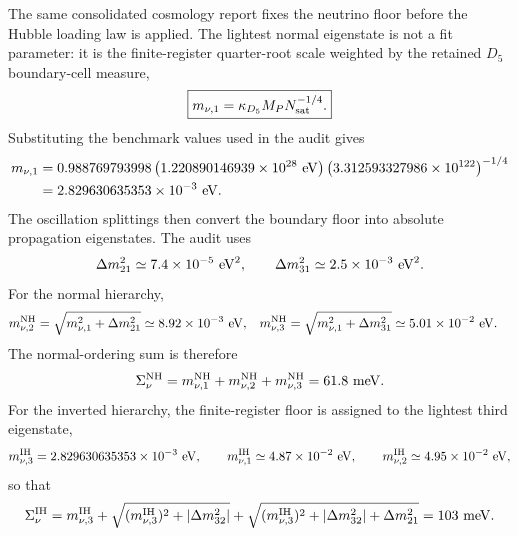 \documentclass[11pt]{article}
\newcommand{\Nsat}{N_{\rm sat}}
\newcommand{\kappad}{\kappa_{D_5}}
\begin{document}
The same consolidated cosmology report fixes the neutrino floor before the Hubble
loading law is applied.  The lightest normal eigenstate is not a fit parameter:
it is the finite-register quarter-root scale weighted by the retained
\(D_5\) boundary-cell measure,
\begin{equation}
\label{eq:neutrino-floor-from-register}
 \boxed{
 m_{\nu,1}
 =
 \kappad M_P\Nsat^{-1/4}.
 }
\end{equation}
Substituting the benchmark values used in the audit gives
\begin{align}
\label{eq:neutrino-floor-numeric-substitution}
 m_{\nu,1}
 &=
 0.988769793998
 \left(1.220890146939\times10^{28}\ {\rm eV}\right)
 \left(3.312593327986\times10^{122}\right)^{-1/4}
 \notag\\
 &=
 2.829630635353\times10^{-3}\ {\rm eV}.
\end{align}
The oscillation splittings then convert the boundary floor into absolute
propagation eigenstates.  The audit uses
\begin{equation}
\label{eq:neutrino-oscillation-splittings}
 \Delta m_{21}^2\simeq7.4\times10^{-5}\ {\rm eV}^2,
 \qquad
 \Delta m_{31}^2\simeq2.5\times10^{-3}\ {\rm eV}^2.
\end{equation}
For the normal hierarchy,
\begin{align}
\label{eq:normal-hierarchy-eigenstates}
 m_{\nu,2}^{\rm NH}
 &=
 \sqrt{m_{\nu,1}^2+\Delta m_{21}^2}
 \simeq8.92\times10^{-3}\ {\rm eV},
 &
 m_{\nu,3}^{\rm NH}
 &=
 \sqrt{m_{\nu,1}^2+\Delta m_{31}^2}
 \simeq5.01\times10^{-2}\ {\rm eV}.
\end{align}
The normal-ordering sum is therefore
\begin{equation}
\label{eq:normal-hierarchy-sum}
 \Sigma_{\nu}^{\rm NH}
 =
 m_{\nu,1}^{\rm NH}
 +m_{\nu,2}^{\rm NH}
 +m_{\nu,3}^{\rm NH}
 =
 61.8\ {\rm meV}.
\end{equation}
For the inverted hierarchy, the finite-register floor is assigned to the
lightest third eigenstate,
\begin{equation}
\label{eq:inverted-hierarchy-eigenstates}
 m_{\nu,3}^{\rm IH}
 =
 2.829630635353\times10^{-3}\ {\rm eV},
 \qquad
 m_{\nu,1}^{\rm IH}\simeq4.87\times10^{-2}\ {\rm eV},
 \qquad
 m_{\nu,2}^{\rm IH}\simeq4.95\times10^{-2}\ {\rm eV},
\end{equation}
so that
\begin{equation}
\label{eq:inverted-hierarchy-sum}
 \Sigma_{\nu}^{\rm IH}
 =
 m_{\nu,3}^{\rm IH}
 +
 \sqrt{(m_{\nu,3}^{\rm IH})^2+|\Delta m_{32}^2|}
 +
 \sqrt{(m_{\nu,3}^{\rm IH})^2+|\Delta m_{32}^2|+\Delta m_{21}^2}
 =
 103\ {\rm meV}.
\end{equation}
\end{document}

